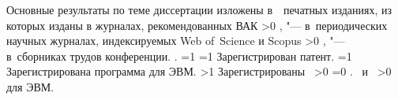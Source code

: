 {\begin{refsection}
        \nocite{*}%
        {\publications} Основные результаты по теме диссертации изложены в~~печатных изданиях,
         из которых изданы в журналах, рекомендованных ВАК\sloppy%
        \ifnum \value{citeauthorscopuswos}>0%
            ,  "--- в~периодических научных журналах, индексируемых Web of~Science и Scopus\sloppy%
        \fi%
        \ifnum \value{citeauthorconf}>0%
            ,  "--- в~сборниках трудов конференции.
        \else%
            .
        \fi%
        \ifnum \value{citeregistered}=1%
            \ifnum \value{citeauthorpatent}=1%
                Зарегистрирован  патент.
            \fi%
            \ifnum \value{citeauthorprogram}=1%
                Зарегистрирована  программа для ЭВМ.
            \fi%
        \fi%
        \ifnum \value{citeregistered}>1%
            Зарегистрированы\ %
            \ifnum \value{citeauthorpatent}>0%
            \sloppy%
            \ifnum \value{citeauthorprogram}=0 . \else \ и~\fi%
            \fi%
            \ifnum \value{citeauthorprogram}>0%
             для ЭВМ.
            \fi%
        \fi%
    \end{refsection}%
    \begin{refsection}
        \nocite{vakbib2}%
        \nocite{bib1}%
        \nocite{confbib1}%
    \end{refsection}%
}


